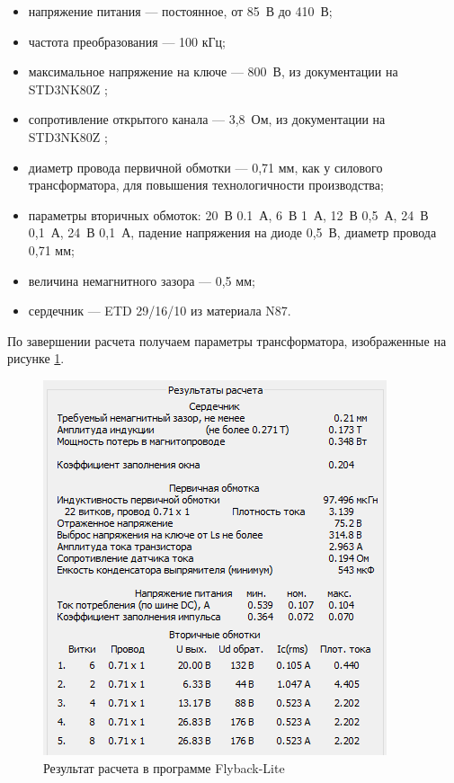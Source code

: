\documentclass[utf8x, 14pt, oneside, a4paper]{article}
\begin{document}
		\begin{itemize}
			\item напряжение питания --- постоянное, от 85~В до 410~В;
			\item частота преобразования --- 100 кГц;
			\item максимальное напряжение на ключе --- 800~В, из документации на STD3NK80Z \cite{bib:STD3NK80Z};
			\item сопротивление открытого канала --- 3,8~Ом, из документации на STD3NK80Z \cite{bib:STD3NK80Z};
			\item диаметр провода первичной обмотки --- 0,71 мм, как у силового трансформатора, для повышения технологичности производства;
			\item параметры вторичных обмоток: 20~В 0.1~А, 6~В 1~А, 12~В 0,5~А, 24~В 0,1~А, 24~В 0,1~А, падение напряжения на диоде 0,5~В, диаметр провода 0,71 мм;
			\item величина немагнитного зазора --- 0,5 мм;
			\item сердечник --- ETD 29/16/10 из материала N87.
		\end{itemize}
	
		По завершении расчета получаем параметры трансформатора, изображенные на рисунке \ref{fig:flyback_result}.
		
		\begin{figure}[H]
			\centering
			\includegraphics[width=0.7\linewidth]{"Рисунки/Flyback-Lite-result"}
			\caption{Результат расчета в программе Flyback-Lite}
			\label{fig:flyback_result}
		\end{figure}
	
\end{document}
